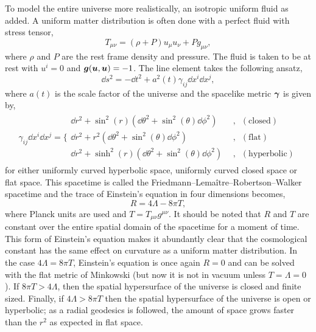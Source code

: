 To model the entire universe more realistically, an isotropic uniform fluid as added. A uniform matter distribution is often done with a perfect fluid with stress tensor,
\begin{equation}
T_{\mu\nu} = (\rho+P)u_\mu u_\nu + Pg_{\mu\nu},
\end{equation}
where $\rho$ and $P$ are the rest frame density and pressure. The fluid is taken to be at rest with $u^i =0$ and $\boldsymbol{g}(\boldsymbol{u},\boldsymbol{u})=-1$. The line element takes the following ansatz,
\begin{equation}
\dd s^2 = -\dd t^2 + a^2(t) \gamma_{ij} \dd x^i \dd x^j,
\end{equation}
where $a(t)$ is the scale factor of the universe and the spacelike metric $\boldsymbol{\gamma}$ is given by,
\begin{align}
\gamma_{ij} \dd x^i \dd x^j = 
\Bigg\{
\begin{array}{ll}
{\dd r^2} + \sin^2(r) \left(\dd \theta^2 + \sin^2(\theta) \dd \phi^2 \right)\quad&, \,\,\,(\mathrm{closed}) \\
\dd r^2 + r^2 \left(\dd \theta^2 + \sin^2(\theta) \dd \phi^2 \right)\,\quad\quad&, \,\,\,(\mathrm{flat}) \\
{\dd r^2} + \sinh^2(r) \left(\dd \theta^2 + \sin^2(\theta) \dd \phi^2 \right)&, \,\,\,(\mathrm{hyperbolic} ) 
\end{array}
\end{align}
for either uniformly curved hyperbolic space, uniformly curved closed space or flat space. This spacetime is called the Friedmann–Lemaître–Robertson–Walker spacetime and the trace of Einstein's equation in four dimensions becomes,
\begin{equation}
R = 4\Lambda -8\pi T,
\end{equation}
where Planck units are used and $T=T_{\mu\nu}g^{\mu\nu}$. It should be noted that $R$ and $T$ are constant over the entire spatial domain of the spacetime for a moment of time. This form of Einstein's equation makes it abundantly clear that the cosmological constant has the same effect on curvature as a uniform matter distribution. In the case $4 \Lambda = 8 \pi T$, Einstein's equation is once again $R=0$ and can be solved with the flat metric of Minkowski (but now it is not in vacuum unless $T=\Lambda=0$). If $8\pi T> 4\Lambda$, then the spatial hypersurface of the universe is closed and finite sized. Finally, if $4\Lambda > 8 \pi T$ then the spatial hypersurface of the universe is open or hyperbolic; as a radial geodesics is followed, the amount of space grows faster than the $r^2$ as expected in flat space.

